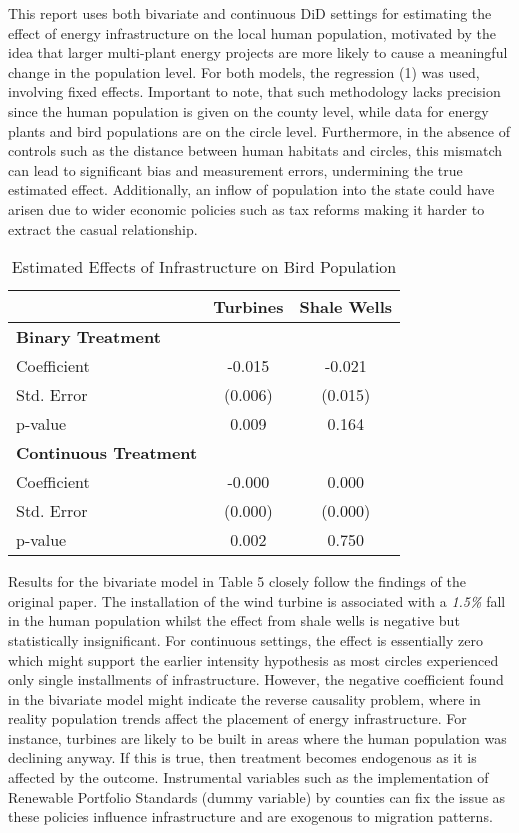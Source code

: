 \documentclass{article}
\begin{document}
\addlinespace

This report uses both bivariate and continuous DiD settings for estimating the effect of energy infrastructure on the local human population, motivated by the idea that larger multi-plant energy projects are more likely to cause a meaningful change in the population level. For both models, the regression (1) was used, involving fixed effects. Important to note, that such methodology lacks precision since the human population is given on the county level, while data for energy plants and bird populations are on the circle level. Furthermore, in the absence of controls such as the distance between human habitats and circles, this mismatch can lead to significant bias and measurement errors, undermining the true estimated effect. Additionally, an inflow of population into the state could have arisen due to wider economic policies such as tax reforms making it harder to extract the casual relationship. 

\begin{table}[H]
\centering
\caption{Estimated Effects of Infrastructure on Bird Population}
\begin{tabular}{lcc}
\toprule
 & \textbf{Turbines} & \textbf{Shale Wells} \\
\midrule
\textbf{Binary Treatment} \\
Coefficient & -0.015 & -0.021 \\
Std. Error  & (0.006) & (0.015) \\
p-value     & 0.009 & 0.164 \\
\addlinespace
\textbf{Continuous Treatment} \\
Coefficient & -0.000 & 0.000 \\
Std. Error  & (0.000) & (0.000) \\
p-value     & 0.002 & 0.750 \\
\bottomrule
\end{tabular}
\end{table}


\addlinespace

Results for the bivariate model in Table 5 closely follow the findings of the original paper. The installation of the wind turbine is associated with a \textit{1.5\%} fall in the human population whilst the effect from shale wells is negative but statistically insignificant. For continuous settings, the effect is essentially zero which might support the earlier intensity hypothesis as most circles experienced only single installments of infrastructure. However, the negative coefficient found in the bivariate model might indicate the reverse causality problem, where in reality population trends affect the placement of energy infrastructure. For instance, turbines are likely to be built in areas where the human population was declining anyway. If this is true, then treatment becomes endogenous as it is affected by the outcome. Instrumental variables such as the implementation of Renewable Portfolio Standards (dummy variable) by counties can fix the issue as these policies influence infrastructure and are exogenous to migration patterns. 
\end{document}
